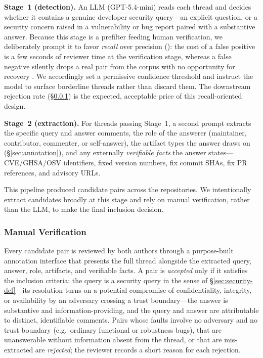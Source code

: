 \textbf{Stage~1 (detection).} An LLM (GPT-5.4-mini) reads each thread and decides whether it
contains a genuine developer security query---an explicit question, or a security concern raised in a vulnerability or bug report paired with a substantive answer. Because this stage
is a prefilter feeding human verification, we deliberately prompt it to favor
\emph{recall} over precision (): the cost of a false positive is a few seconds of
reviewer time at the verification stage, whereas a false negative silently drops
a real pair from the corpus with no opportunity for recovery . 
We accordingly set a permissive  confidence threshold and instruct the model to surface
borderline threads rather than discard them. The downstream  rejection
rate (\S\ref{sec:verification}) is the expected, acceptable price of this
recall-oriented design.

\textbf{Stage~2 (extraction).} For threads passing Stage~1, a second prompt
extracts the specific query and answer comments, the role of the answerer
(maintainer, contributor, commenter, or self-answer), the artifact types the
answer draws on (\S\ref{sec:annotation}), and any externally
\emph{verifiable facts} the answer states---CVE/GHSA/OSV identifiers, fixed version
numbers, fix commit SHAs, fix PR references, and advisory URLs.

This pipeline produced  candidate pairs across the 
repositories. We intentionally extract candidates broadly at this stage and rely
on manual verification, rather than the LLM, to make the final inclusion
decision.

\subsubsection{Manual Verification}
\label{sec:verification}

Every candidate pair is reviewed by both authors through a purpose-built
annotation interface that presents the full thread alongside the extracted
query, answer, role, artifacts, and verifiable facts. A pair is \emph{accepted}
only if it satisfies the inclusion criteria: the query is a security query in
the sense of \S\ref{sec:security-def}---its resolution turns on a potential
compromise of confidentiality, integrity, or availability by an adversary
crossing a trust boundary---the answer is substantive and information-providing,
and the query and answer are attributable to distinct, identifiable comments.
Pairs whose faults involve no adversary and no trust boundary (e.g.\ ordinary
functional or robustness bugs), that are unanswerable without information absent
from the thread, or that are mis-extracted are \emph{rejected}; the reviewer
records a short reason for each rejection.

